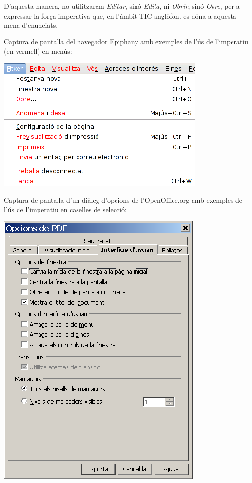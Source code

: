\documentclass[9pt]{cheatsheet}
\begin{document}
\begin{multicols*}{3}
D'aquesta manera, no utilitzarem \emph{Editar}, sinó \emph{Edita}, ni \emph{Obrir}, sinó \emph{Obre}, per a expressar la força imperativa que, en l'àmbit TIC anglòfon, es dóna a aquesta mena d'enunciats.

Captura de pantalla del navegador Epiphany amb exemples de l'ús de l'imperatiu (en vermell) en menús:

\includegraphics[scale=0.35]{images/epiphany.png}

Captura de pantalla d'un diàleg d'opcions de l'OpenOffice.org amb exemples de l'ús de l'imperatiu en caselles de selecció:

\includegraphics[scale=0.35]{images/openoffice.png}



\end{multicols*}
\end{document}
